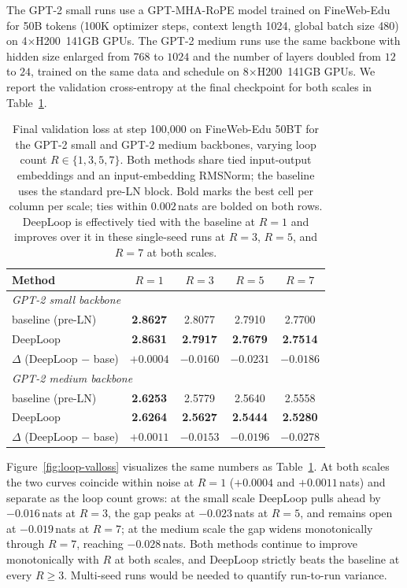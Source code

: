 \documentclass[11pt]{airesearch}
\begin{document}
The GPT-2 small runs use a GPT-MHA-RoPE model trained on
FineWeb-Edu for 50B tokens (100K optimizer steps, context length 1024,
global batch size 480) on 4$\times$H200~141GB GPUs. The GPT-2 medium
runs use the same backbone with hidden size enlarged from $768$ to
$1024$ and the number of layers doubled from $12$ to $24$, trained on
the same data and schedule on 8$\times$H200~141GB GPUs. We report the
validation cross-entropy at the final checkpoint
for both scales in Table~\ref{tab:loop-valloss}.


\begin{table}[ht]
  \centering
  \small
  \caption{Final validation loss at step 100{,}000 on FineWeb-Edu 50BT for
    the GPT-2 small and GPT-2 medium backbones, varying loop count $R \in \{1,3,5,7\}$.
    Both methods share tied input-output embeddings and an input-embedding
    RMSNorm; the baseline uses the standard pre-LN block.
    Bold marks the best cell per column per scale; ties within $0.002$\,nats are bolded on both rows. DeepLoop is effectively tied with the baseline at $R{=}1$ and improves over it in these single-seed runs at $R{=}3$, $R{=}5$, and $R{=}7$ at both scales.}
  \label{tab:loop-valloss}
  \begin{tabular}{lcccc}
    \toprule
    Method & $R=1$ & $R=3$ & $R=5$ & $R=7$ \\
    \midrule
    \multicolumn{5}{l}{\emph{GPT-2 small backbone}} \\
    baseline (pre-LN) & \textbf{2.8627} & 2.8077 & 2.7910 & 2.7700 \\
    DeepLoop                            & \textbf{2.8631} & \textbf{2.7917} & \textbf{2.7679} & \textbf{2.7514} \\
    $\Delta$ (DeepLoop $-$ base)        & $+0.0004$ & $-0.0160$ & $-0.0231$ & $-0.0186$ \\
    \midrule
    \multicolumn{5}{l}{\emph{GPT-2 medium backbone}} \\
    baseline (pre-LN) & \textbf{2.6253} & 2.5779 & 2.5640 & 2.5558 \\
    DeepLoop                            & \textbf{2.6264} & \textbf{2.5627} & \textbf{2.5444} & \textbf{2.5280} \\
    $\Delta$ (DeepLoop $-$ base)        & $+0.0011$ & $-0.0153$ & $-0.0196$ & $-0.0278$ \\
    \bottomrule
  \end{tabular}
\end{table}

Figure~\ref{fig:loop-valloss} visualizes the same numbers as
Table~\ref{tab:loop-valloss}. At both scales the two curves coincide
within noise at $R{=}1$ ($+0.0004$ and $+0.0011$\,nats) and separate as
the loop count grows: at the small scale DeepLoop pulls ahead by
$-0.016$\,nats at $R{=}3$, the gap peaks at $-0.023$\,nats at $R{=}5$,
and remains open at $-0.019$\,nats at $R{=}7$; at the medium scale the
gap widens monotonically through $R{=}7$, reaching $-0.028$\,nats. Both
methods continue to improve monotonically with $R$ at both scales, and
DeepLoop strictly beats the baseline at every $R\geq3$. Multi-seed
runs would be needed to quantify run-to-run variance.
\end{document}
